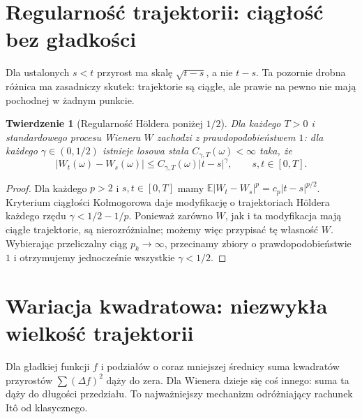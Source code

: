 \documentclass[11pt,a4paper,oneside]{report}
\numberwithin{equation}{chapter}
\theoremstyle{plain}
\newtheorem{twierdzenie}{Twierdzenie}[chapter]
\theoremstyle{definition}
\theoremstyle{remark}
\newcommand{\E}{\mathbb{E}}
\begin{document}
\section{Regularność trajektorii: ciągłość bez gładkości}
Dla ustalonych $s<t$ przyrost ma skalę $\sqrt{t-s}$,
a nie $t-s$. Ta pozornie drobna różnica ma zasadniczy
skutek: trajektorie są ciągłe, ale prawie na pewno nie
mają pochodnej w żadnym punkcie.

\begin{twierdzenie}[Regularność H\"oldera poniżej $1/2$]
Dla każdego $T>0$ i standardowego procesu Wienera $W$
zachodzi z prawdopodobieństwem $1$: dla każdego
$\gamma\in(0,1/2)$ istnieje losowa stała
$C_{\gamma,T}(\omega)<\infty$ taka, że
\[
|W_t(\omega)-W_s(\omega)|
\le C_{\gamma,T}(\omega)|t-s|^\gamma,
\qquad s,t\in[0,T].
\]
\end{twierdzenie}
\begin{proof}
Dla każdego $p>2$ i $s,t\in[0,T]$ mamy
$\E|W_t-W_s|^p=c_p|t-s|^{p/2}$.
Kryterium ciągłości Kołmogorowa daje modyfikację
o trajektoriach H\"oldera każdego rzędu
$\gamma<1/2-1/p$. Ponieważ zarówno $W$, jak i ta
modyfikacja mają ciągłe trajektorie, są nierozróżnialne;
możemy więc przypisać tę własność $W$.
Wybierając przeliczalny ciąg $p_k\to\infty$,
przecinamy zbiory o prawdopodobieństwie $1$ i
otrzymujemy jednocześnie wszystkie $\gamma<1/2$.
\end{proof}

\section{Wariacja kwadratowa: niezwykła wielkość trajektorii}
Dla gładkiej funkcji $f$ i podziałów o coraz mniejszej
średnicy suma kwadratów przyrostów $\sum(\Delta f)^2$
dąży do zera. Dla Wienera dzieje się coś innego:
suma ta dąży do długości przedziału. To najważniejszy
mechanizm odróżniający rachunek Itô od klasycznego.
\end{document}
